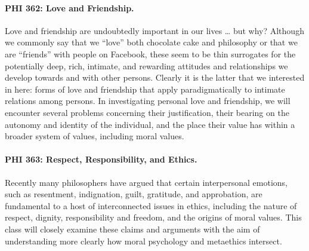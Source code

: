 \documentclass[%
  11pt,%
]{article}
\let\oldparagraph\paragraph
\renewcommand\paragraph[1]{\oldparagraph{\textcolor{myblue}{#1}}}
\begin{document}
\paragraph{PHI 362: Love and Friendship.}

Love and friendship are undoubtedly important in our lives \dots{} but why? Although we commonly say that we \enquote{love} both chocolate cake and philosophy or that we are \enquote{friends} with people on Facebook, these seem to be thin surrogates for the potentially deep, rich, intimate, and rewarding attitudes and relationships we develop towards and with other persons. Clearly it is the latter that we interested in here: forms of love and friendship that apply paradigmatically to intimate relations among persons. In investigating personal love and friendship, we will encounter several problems concerning their justification, their bearing on the autonomy and identity of the individual, and the place their value has within a broader system of values, including moral values.

\paragraph{PHI 363: Respect, Responsibility, and Ethics.}

Recently many philosophers have argued that certain interpersonal emotions, such as resentment, indignation, guilt, gratitude, and approbation, are fundamental to a host of interconnected issues in ethics, including the nature of respect, dignity, responsibility and freedom, and the origins of moral values. This class will closely examine these claims and arguments with the aim of understanding more clearly how moral psychology and metaethics intersect.

\ifdefined\HCode
\fi
\end{document}
